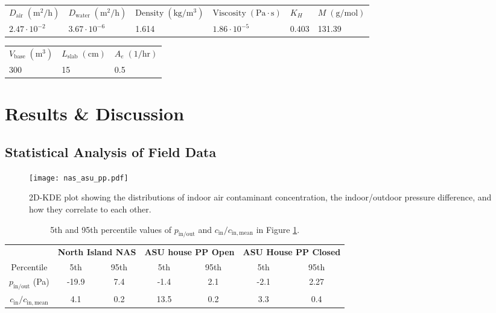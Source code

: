 \documentclass[journal=esthag,manuscript=article]{achemso}
\begin{document}
\begin{table}[htb!]
  \begin{tabular}{l l l l l l}
    \toprule
    $D_\mathrm{air} \; \mathrm{(m^2/h)}$  & $D_\mathrm{water} \; \mathrm{(m^2/h)}$  & $\mathrm{Density} \; \mathrm{(kg/m^3)}$ & $\mathrm{Viscosity} \; \mathrm{(Pa \cdot s)}$  & $K_H$ & $M \; \mathrm{(g/mol)}$ \\
    $2.47 \cdot 10^{-2}$  & $3.67 \cdot 10^{-6}$  & 1.614 & $1.86 \cdot 10^{-5}$  & 0.403 & 131.39 \\
    \bottomrule
  \end{tabular}
  \bigskip
  \begin{tabular}{l l l}
    \toprule
    $V_\mathrm{base} \; \mathrm{(m^3)}$  & $L_\mathrm{slab} \; \mathrm{(cm)}$  & $A_e \; \mathrm{(1/hr)}$ \\
    300  &  15  & 0.5 \\
    \bottomrule
  \end{tabular}
\end{table}

\section{Results \& Discussion}

\subsection{Statistical Analysis of Field Data}

\begin{figure}[htb!]
		\centering
    \caption{2D-KDE plot showing the distributions of indoor air contaminant concentration, the indoor/outdoor pressure difference, and how they correlate to each other.}
    \label{fig:kde}
    \texttt{[image: nas\_asu\_pp.pdf]}
\end{figure}

\begin{table}[htb!]
  \caption{5th and 95th percentile values of $p_\mathrm{in/out}$ and $c_\mathrm{in}/c_\mathrm{in,mean}$ in Figure \ref{fig:kde}.}\label{tbl:percentiles}
  \begin{tabular}{c c c c c c c}
    \toprule
    & \multicolumn{2}{c|}{\textbf{North Island NAS}} & \multicolumn{2}{c|}{\textbf{ASU house PP Open}} & \multicolumn{2}{c}{\textbf{ASU House PP Closed}} \\
    Percentile & 5th & 95th & 5th & 95th & 5th & 95th \\
    $p_\mathrm{in/out}$ (Pa) & -19.9 & 7.4 & -1.4 & 2.1 & -2.1 & 2.27 \\
    $c_\mathrm{in}/c_\mathrm{in,mean}$ & 4.1 & 0.2 & 13.5 & 0.2 & 3.3 & 0.4 \\
    \bottomrule
  \end{tabular}
\end{table}
\end{document}
